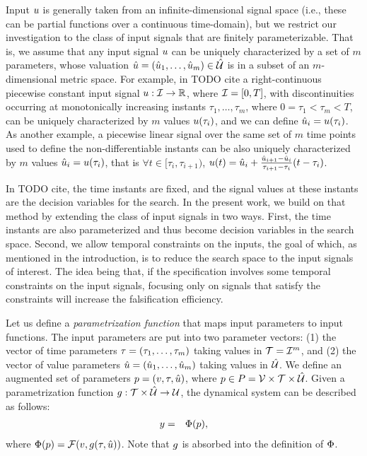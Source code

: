 Input $u$ is generally taken from an infinite-dimensional signal space (i.e., these can be partial functions over a continuous time-domain), but we restrict our investigation to the class of  input signals that are finitely parameterizable. That is, we assume that any input signal $u$ 
can be uniquely characterized by a set of $m$ parameters, whose valuation $\hat{u} =(\hat{u}_1,\ldots,\hat{u}_m) \in \hat{\mathcal{U}}$ is in a subset of an $m$-dimensional metric space. For example, in \cite{} {\color{red} TODO cite} a right-continuous piecewise constant input signal $u:\mathcal{I} \rightarrow \mathbb{R}$, where $\mathcal{I}=[ 0,T ]$, with discontinuities occurring at monotonically increasing instants $\tau_1,\ldots, \tau_m$, where $0=\tau_1<\tau_m<T$, can be uniquely characterized by $m$ values $u(\tau_i)$, and we can define $\hat{u}_i=u(\tau_i)$. As another example, a piecewise linear signal over the same set of $m$ time points used to define the non-differentiable instants can be also uniquely characterized by $m$ values $\hat{u}_i = u(\tau_i)$, that is $\forall t \in [\tau_i, \tau_{i+1})$, $u(t) = \hat{u}_i  + 
\frac{\hat{u}_{i+1} - \hat{u}_i}{\tau_{i+1} -  \tau_i}(t-\tau_i)$.

In \cite{} {\color{red} TODO cite}, the time instants are fixed, and the signal values at these instants are the decision variables for the search. In the present work, we build on that method by extending the class of input signals in two ways. First, the time instants are also parameterized and thus become decision variables in the search space. Second, we allow temporal constraints on the inputs, the goal of which, as mentioned in the introduction, is to reduce the search space to the input signals of interest. The idea being that, if the specification involves some temporal constraints on the input signals, focusing only on signals that satisfy the constraints will increase the falsification efficiency. 

Let us define a {\em parametrization function} that maps input parameters to input functions. The input parameters are put into two parameter vectors: (1) the vector of time parameters $\tau = (\tau_1,\ldots, \tau_m)$ taking values in $\mathcal{T}=\mathcal{I}^m$, and (2) the vector of value parameters $\hat{u}= (\hat{u}_1, \ldots, \hat{u}_m)$ taking values in $\hat{\mathcal{U}}$. We define an augmented set of parameters $p = (v, \tau, \hat{u})$, where $p \in P = \mathcal{V} \times \mathcal{T}  \times \hat{\mathcal{U}}$. Given a parametrization function $g: \mathcal{T} \times \hat{\mathcal{U}} \rightarrow \mathcal{U}$, the dynamical system can be described as follows:
\begin{eqnarray} \label{eq:behaviorfunc}
y &=& \Phi(p),
\end{eqnarray}
where $\Phi(p) = \mathcal{F} (v, g(\tau, \hat{u}))$.  Note that $g$ is absorbed into the definition of $\Phi$.

